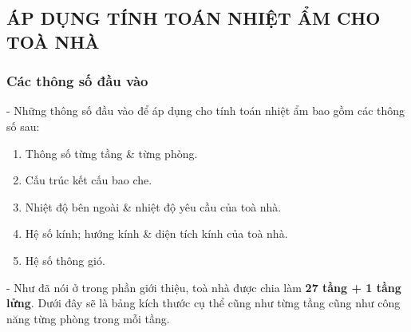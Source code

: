 \subsection{ÁP DỤNG TÍNH TOÁN NHIỆT ẨM CHO TOÀ NHÀ}
\subsubsection{Các thông số đầu vào}
- Những thông số đầu vào để áp dụng cho tính toán nhiệt ẩm bao gồm các thông số sau:

\begin{enumerate}[leftmargin=2.2cm]
	\item Thông số từng tầng \& từng phòng.
	\item Cấu trúc kết cấu bao che.
	\item Nhiệt độ bên ngoài \& nhiệt độ yêu cầu của toà nhà.
	\item Hệ số kính; hướng kính \& diện tích kính của toà nhà.
	\item Hệ số thông gió.
\end{enumerate}

- Như đã nói ở trong phần giới thiệu, toà nhà được chia làm \textbf{27 tầng + 1 tầng lửng}. Dưới đây sẽ là bảng kích thước cụ thể cũng như từng tầng cũng như công năng từng phòng trong mỗi tầng.


